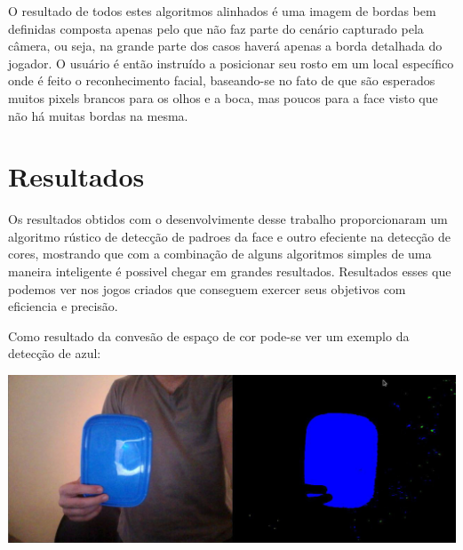 \documentclass[a4paper]{article}
\begin{document}
O resultado de todos estes algoritmos alinhados é uma imagem de bordas bem definidas composta apenas pelo que não faz parte do cenário capturado pela câmera, ou seja, na grande parte dos casos haverá apenas a borda detalhada do jogador. O usuário é então instruído a posicionar seu rosto em um local específico onde é feito o reconhecimento facial, baseando-se no fato de que são esperados muitos pixels brancos para os olhos e a boca, mas poucos para a face visto que não há muitas bordas na mesma.



\section{Resultados}

Os resultados obtidos com o desenvolvimente desse trabalho proporcionaram um algoritmo rústico de detecção de padroes da face e outro efeciente na detecção de cores, mostrando que com a combinação de alguns algoritmos simples de uma maneira inteligente é possivel chegar em grandes resultados. Resultados esses que podemos ver nos jogos criados que conseguem exercer seus objetivos com eficiencia e precisão.

Como resultado da convesão de espaço de cor pode-se ver um exemplo da detecção de azul:

\vspace{5.00mm}
\begin{center}
\includegraphics[scale=0.3]{img2.jpg}
\end{center}
\vspace{5.00mm}
\end{document}
